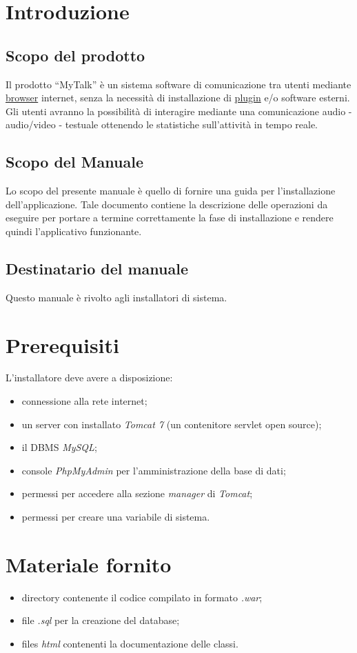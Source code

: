 \section{Introduzione}
\subsection{Scopo del prodotto}
Il prodotto ``MyTalk'' è un sistema software di comunicazione tra utenti mediante \underline{browser} internet, senza la necessità di installazione di \underline{plugin} e/o software esterni. Gli utenti avranno la possibilità di interagire mediante una comunicazione audio - audio/video - testuale ottenendo le statistiche sull'attività in tempo reale.

\subsection{Scopo del Manuale}
Lo scopo del presente manuale è quello di fornire una guida per l'installazione dell'applicazione. Tale documento contiene la descrizione delle operazioni da eseguire per portare a termine correttamente la fase di installazione e rendere quindi l'applicativo funzionante.

\subsection{Destinatario del manuale}
Questo manuale è rivolto agli installatori di sistema.

\section{Prerequisiti}
L'installatore deve avere a disposizione:
\begin{itemize}
\item connessione alla rete internet;
\item un server con installato \textit{Tomcat 7} (un contenitore servlet open source);
\item il DBMS \textit{MySQL};
\item console \textit{PhpMyAdmin} per l'amministrazione della base di dati;
\item permessi per accedere alla sezione \textit{manager} di \textit{Tomcat};
\item permessi per creare una variabile di sistema.
\end{itemize} 

\section{Materiale fornito}
\begin{itemize}
\item directory \caName contenente il codice compilato in formato \textit{.war};
\item file \textit{.sql} per la creazione del database;
\item files \textit{html} contenenti la documentazione delle classi.
\end{itemize}

